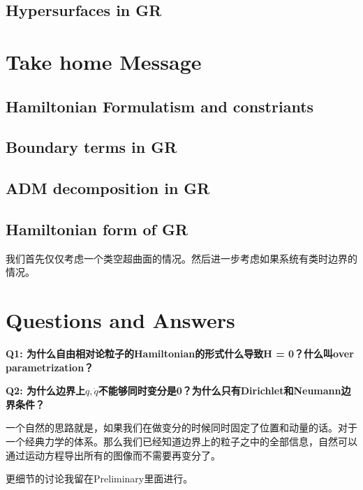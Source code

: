 \subsection{Hypersurfaces in GR}





\section{Take home Message}\label{sec:Take home Message} %

\subsection{Hamiltonian Formulatism and constriants}


\subsection{Boundary terms in GR}


\subsection{ADM decomposition in GR}


\subsection{Hamiltonian form of GR}
我们首先仅仅考虑一个类空超曲面的情况。然后进一步考虑如果系统有类时边界的情况。


\section{Questions and Answers}\label{sec:Questions and Answers} %


\textbf{Q1: 为什么自由相对论粒子的Hamiltonian的形式什么导致H = 0？什么叫over parametrization？}


\textbf{Q2: 为什么边界上$ q, \dot{q} $不能够同时变分是0？为什么只有Dirichlet和Neumann边界条件？}

一个自然的思路就是，如果我们在做变分的时候同时固定了位置和动量的话。对于一个经典力学的体系。那么我们已经知道边界上的粒子之中的全部信息，自然可以通过运动方程导出所有的图像而不需要再变分了。

更细节的讨论我留在Preliminary里面进行。





